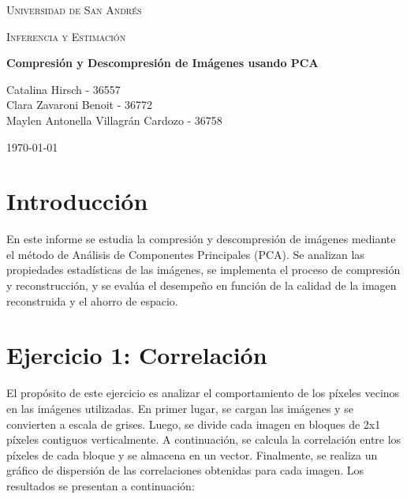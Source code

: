 \documentclass[a4paper,12pt]{article}
\begin{document}
\noindent
\begin{minipage}{\textwidth}
    \centering
    {\scshape\LARGE Universidad de San Andrés \par}
    \vspace{1.2cm}
    {\scshape\Large Inferencia y Estimación\par}
    \vspace{1.2cm}
    {\huge\bfseries Compresión y Descompresión de Imágenes usando PCA\par}
    \vspace{1.5cm}
    {\large
    Catalina Hirsch - 36557 \\ Clara Zavaroni Benoit - 36772 \\ Maylen Antonella Villagrán Cardozo - 36758 \\}
    \vspace{1cm}
    {\large \today\par}
\end{minipage}



\begin{abstract}
La realización de este trabajo práctico tiene como objetivo aplicar el método de \textbf{Análisis de Componentes Principales (PCA)} en la compresión de imágenes. Se busca reducir el espacio de almacenamiento minimizando la pérdida de información, conservando los datos que contienen la mayor parte de la varianza. Posteriormente, se descomprime la imagen y se compara con la original para evaluar la calidad de la compresión, utilizando métricas objetivas. El desempeño se evalúa en función de la cantidad de componentes principales utilizados. Finalmente, se discuten los resultados y conclusiones obtenidas.
\end{abstract}


\section*{Introducción}
En este informe se estudia la compresión y descompresión de imágenes mediante el método de Análisis de Componentes Principales (PCA). Se analizan las propiedades estadísticas de las imágenes, se implementa el proceso de compresión y reconstrucción, y se evalúa el desempeño en función de la calidad de la imagen reconstruida y el ahorro de espacio.
\newpage
\section*{Ejercicio 1: Correlación}
El propósito de este ejercicio es analizar el comportamiento de los píxeles vecinos en las imágenes utilizadas. En primer lugar, se cargan las imágenes y se convierten a escala de grises. Luego, se divide cada imagen en bloques de 2x1 píxeles contiguos verticalmente. A continuación, se calcula la correlación entre los píxeles de cada bloque y se almacena en un vector. Finalmente, se realiza un gráfico de dispersión de las correlaciones obtenidas para cada imagen. Los resultados se presentan a continuación:
\end{document}
